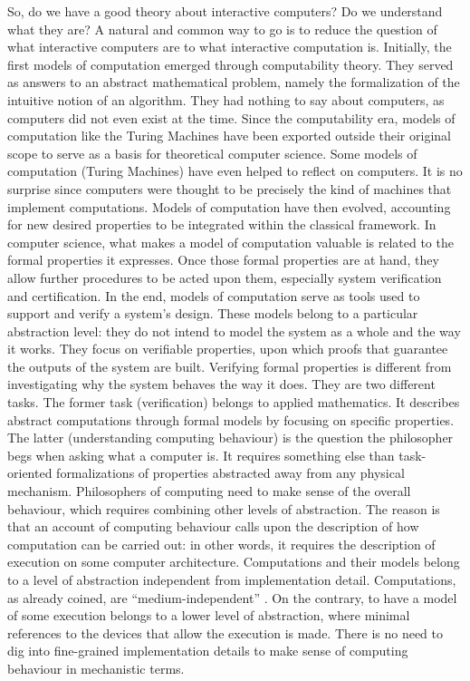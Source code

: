 \documentclass[a4paper, 11pt, twoside]{article}
\begin{document}
So, do we have a good theory about interactive computers? Do we understand what they are? A natural and common way to go is to reduce the question of what interactive computers are to what interactive computation is. Initially, the first models of computation emerged through computability theory. They served as answers to an abstract mathematical problem, namely the formalization of the intuitive notion of an algorithm. They had nothing to say about computers, as computers did not even exist at the time. Since the computability era, models of computation like the Turing Machines have been exported outside their original scope to serve as a basis for theoretical computer science. Some models of computation (Turing Machines) have even helped to reflect on computers. It is no surprise since computers were thought to be precisely the kind of machines that implement computations. Models of computation have then evolved, accounting for new desired properties to be integrated within the classical framework. In computer science, what makes a model of computation valuable is related to the formal properties it expresses. Once those formal properties are at hand, they allow further procedures to be acted upon them, especially system verification and certification.  In the end, models of computation serve as tools used to support and verify a system’s design. These models belong to a particular abstraction level: they do not intend to model the system as a whole and the way it works. They focus on verifiable properties, upon which proofs that guarantee the outputs of the system are built. Verifying formal properties is different from investigating why the system behaves the way it does. They are two different tasks. The former task (verification) belongs to applied mathematics. It describes abstract computations through formal models by focusing on specific properties. The latter (understanding computing behaviour) is the question the philosopher begs when asking what a computer is. It requires something else than task-oriented formalizations of properties abstracted away from any physical mechanism. Philosophers of computing need to make sense of the overall behaviour, which requires combining other levels of abstraction.  The reason is that an account of computing behaviour calls upon the description of how computation can be carried out: in other words, it requires the description of execution on some computer architecture.
Computations and their models belong to a level of abstraction independent from implementation detail. Computations, as already coined, are ``medium-independent'' \parencite{Klein2020}. On the contrary, to have a model of some execution belongs to a lower level of abstraction, where minimal references to the devices that allow the execution is made. There is no need to dig into fine-grained implementation details to make sense of computing behaviour in mechanistic terms.
\end{document}
